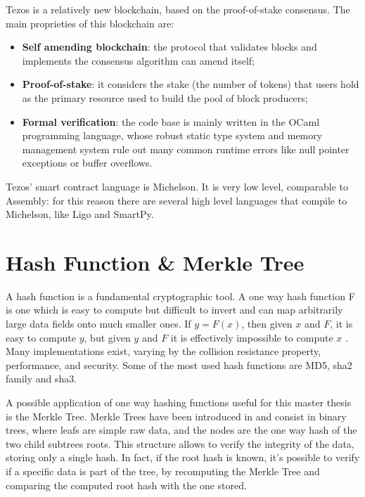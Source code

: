 Tezos \cite{allombert_introduction_2019} is a relatively new blockchain, based on the proof-of-stake consensus. The main proprieties of this blockchain are:
\begin{itemize}
      \item \textbf{Self amending blockchain}: the protocol that validates blocks and implements the consensus algorithm can amend itself;
            \vspace{-0.11in}
      \item \textbf{Proof-of-stake}: it considers the stake (the number of tokens) that users hold as the primary resource used to build the pool of block producers;
            \vspace{-0.11in}
      \item \textbf{Formal verification}: the code base is mainly written in the OCaml programming language, whose robust static type system and memory management system rule out many common runtime errors like null pointer exceptions or buffer overflows.
\end{itemize}

Tezos' smart contract language is Michelson. It is very low level, comparable to Assembly: for this reason there are several high level languages that compile to Michelson, like Ligo and SmartPy. 

\section{Hash Function \& Merkle Tree}

A hash function is a fundamental cryptographic tool. A one way hash function F is one which is easy to compute but difficult to invert and can map arbitrarily large data fields onto much smaller ones. If $y = F(x)$, then given $x$ and $F$, it is easy to compute $y$, but given $y$ and $F$ it is effectively impossible to compute $x$ \cite{merkle_secrecy_1979}. Many implementations exist, varying by the collision resistance property, performance, and security. Some of the most used hash functions are MD5, sha2 family and sha3.

A possible application of one way hashing functions useful for this master thesis is the Merkle Tree. Merkle Trees have been introduced in \cite{merkle_secrecy_1979} and consist in binary trees, where leafs are simple raw data, and the nodes are the one way hash of the two child subtrees roots. This structure allows to verify the integrity of the data, storing only a single hash. In fact, if the root hash is known, it's possible to verify if a specific data is part of the tree, by recomputing the Merkle Tree and comparing the computed root hash with the one stored.

